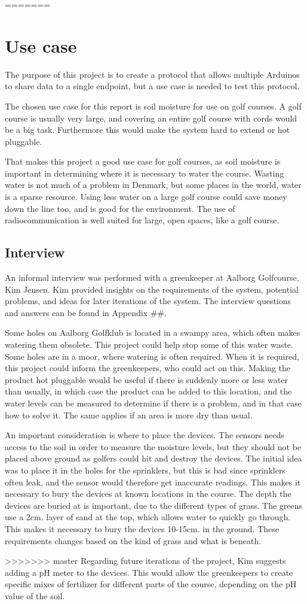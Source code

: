 =======
\chapter{Use case}
The purpose of this project is to create a protocol that allows multiple Arduinos to share data to a single endpoint, but a use case is needed to test this protocol.

The chosen use case for this report is soil moisture for use on golf courses. A golf course is usually very large, and covering an entire golf course with cords would be a big task. Furthermore this would make the system hard to extend or hot pluggable.

That makes this project a good use case for golf courses, as soil moisture is important in determining where it is necessary to water the course. Wasting water is not much of a problem in Denmark, but some places in the world, water is a sparse resource. Using less water on a large golf course could save money down the line too, and is good for the environment. The use of radiocommunication is well suited for large, open spaces, like a golf course.

\section{Interview}
An informal interview was performed with a greenkeeper at Aalborg Golfcourse, Kim Jensen. Kim provided insights on the requirements of the system, potential problems, and ideas for later iterations of the system. The interview questions and answers can be found in Appendix \#\#. 

Some holes on Aalborg Golfklub is located in a swampy area, which often makes watering them obsolete. This project could help stop some of this water waste. Some holes are in a moor, where watering is often required. When it is required, this project could inform the greenkeepers, who could act on this.
Making the product hot pluggable would be useful if there is suddenly more or less water than usually, in which case the product can be added to this location, and the water levels can be measured to determine if there is a problem, and in that case how to solve it. The same applies if an area is more dry than usual.

An important consideration is where to place the devices. The sensors needs access to the soil in order to measure the moisture levels, but they should not be placed above ground as golfers could hit and destroy the devices. The initial idea was to place it in the holes for the sprinklers, but this is bad since sprinklers often leak, and the sensor would therefore get inaccurate readings.
This makes it necessary to bury the devices at known locations in the course. The depth the devices are buried at is important, due to the different types of grass. The greens use a 2cm. layer of sand at the top, which allows water to quickly go through. This makes it necessary to bury the devices 10-15cm. in the ground. These requirements changes based on the kind of grass and what is beneath.

>>>>>>> master
Regarding future iterations of the project, Kim suggests adding a pH meter to the devices. This would allow the greenkeepers to create specific mixes of fertilizer for different parts of the course, depending on the pH value of the soil. 
